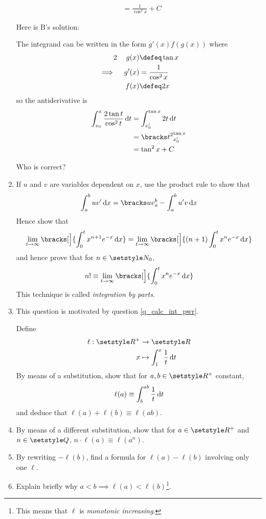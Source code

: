 \begin{enumerate}
\begin{tcolorbox}
\begin{align*}
     &= \frac 1{\cos^2 x} + C
   \end{align*}
  \end{tcolorbox}
  Here is B's solution:
  \begin{tcolorbox}
   The integrand can be written in the form \(g'(x) f(g(x))\) where
   \begin{alignat*}2
    &&g(x) &\defeq \tan x \\
    \implies{}&& g'(x) &= \frac 1{\cos^2 x} \\
    &&f(x) &\defeq 2x
   \end{alignat*}
   so the antiderivative is
   \begin{align*}
    \integ[x_0]<x>{\frac{2\tan t}{\cos^2 t}}{t}
     &= \integ[x_0']<\tan x>{2t}{t} \\
     &= \eval{x_0'}{\tan x}{t^2} \\
     &= \tan^2 x + C
   \end{align*}
  \end{tcolorbox}
  Who is correct?
 \item
  If \(u\) and \(v\) are variables dependent on \(x\), use the product rule to
  show that
  \begin{equation*}
   \integ[a]<b>{uv'}{x} = \eval{a}{b}{uv} - \integ[a]<b>{u'v}{x}
  \end{equation*}
  Hence show that
  \begin{equation*}
   \lim_{t \to \infty}
    \bracks[\Big]{
     \integ[0]<t>{x^{n + 1} e^{-x}}{x}
    } =
   \lim_{t \to \infty}
    \bracks[\Big]{
     (n + 1)\integ[0]<t>{x^n e^{-x}}{x}
    }
  \end{equation*}
  and hence prove that for \(n \in \Naturals_0\),
  \begin{equation*}
   n! \equiv \lim_{t \to \infty}
    \bracks[\Big]{
     \integ[0]<t>{x^n e^{-x}}{x}
    }
  \end{equation*}
  This technique is called \emph{integration by parts}.
 \item
  This question is motivated by question \ref{q_calc_int_pwr}.

  Define
  \begin{align*}
   \ell : \Reals^+ &\to \Reals\\
   x &\mapsto \integ[1]<x>{\frac 1t}{t}
  \end{align*}
  By means of a substitution, show that for \(a, b \in \Reals^+\) constant,
  \begin{equation*}
   \ell(a) \equiv \integ[b]<ab>{\frac 1t}{t}
  \end{equation*}
  and deduce that \(\ell(a) + \ell(b) \equiv \ell(ab)\).
 \item
  By means of a different substitution, show that for \(a \in \Reals^+\) and
  \(n \in \Rationals\), \(n \cdot \ell(a) \equiv \ell(a^n)\).
 \item
  By rewriting \(-\ell(b)\), find a formula for
  \(\ell(a) - \ell(b)\) involving only one \(\ell\).
 \item
  Explain briefly why \(a < b \implies \ell(a) < \ell(b)\)\footnote{
   This means that \(\ell\) is \emph{monotonic increasing}.
  }.


\end{enumerate}
